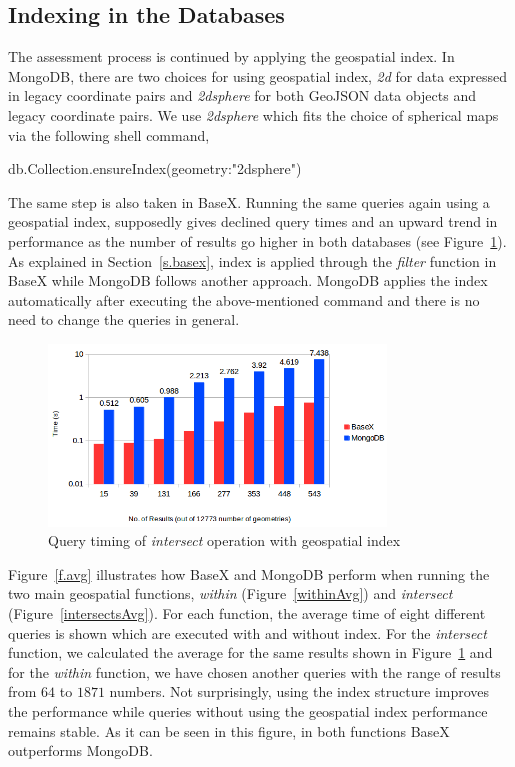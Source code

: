 \documentclass[a4paper,12pt]{article}
\begin{document}
\subsection{Indexing in the Databases}
\label{index}
The assessment process is continued by applying the geospatial index. In MongoDB, there are two choices for using geospatial index, \textit{2d} for data expressed in legacy coordinate pairs and \textit{2dsphere} for both GeoJSON data objects and legacy coordinate pairs. We use \textit{2dsphere} which fits the choice of spherical maps via the following shell command,
\vspace{10px}
\begin{fakeJSON}
db.Collection.ensureIndex({geometry:"2dsphere"}) 
\end{fakeJSON}
\vspace{10px}
The same step is also taken in BaseX. Running the same queries again using a geospatial index, supposedly gives declined query times and an upward trend in performance as the number of results go higher in both databases (see Figure~\ref{figBXvsMongoIndexIntersects}). As explained in Section~\ref{s.basex}, index is applied through the \textit{filter} function in BaseX while MongoDB follows another approach. MongoDB applies the index automatically after executing the above-mentioned command and there is no need to change the queries in general.
\begin{figure}
\centering
\includegraphics[width=0.8\textwidth]{BXvsMongo-Intersects-Index-Sec-log-newColor}
\caption{Query timing of \textit{intersect} operation with geospatial index}
\label{figBXvsMongoIndexIntersects}
\end{figure}
Figure~\ref{f.avg} illustrates how BaseX and MongoDB perform when running the two main geospatial functions, \textit{within} (Figure~\ref{withinAvg}) and \textit{intersect} (Figure~\ref{intersectsAvg}). For each function, the average time of eight different queries is shown which are executed with and without index. For the \textit{intersect} function, we calculated the average for the same results shown in Figure~\ref{figBXvsMongoIndexIntersects} and for the \textit{within} function, we have chosen another queries with the range of results from $64$ to $1871$ numbers.
Not surprisingly, using the index structure improves the performance while queries without using the geospatial index performance remains stable. As it can be seen in this figure, in both functions BaseX outperforms MongoDB.
\end{document}
